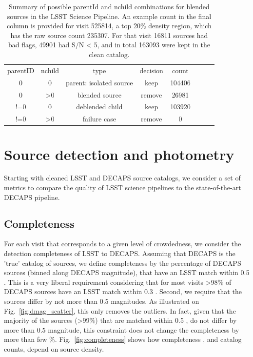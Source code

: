 \documentclass[DM,lsstdraft,toc,usenatbib]{lsstdoc}
\begin{document}
\begin{table}
\centering
\caption{ Summary of possible parentId and nchild combinations for blended sources in the LSST Science Pipeline. An example count in the final column is provided for visit 525814, a top 20\% density region, which has the raw source count 235307. For that visit  16811 sources had bad flags, 49901  had S/N < 5, and in total 163093 were kept in the clean catalog.  }
\label{tab:lsst_deblend}
\begin{tabular}{cccccccc}
parentID & nchild & type  & decision &  count \\
0 & 0 & parent: isolated source & keep & 104406 \\
0 & >0 & blended source & remove & 26981 \\
!=0 & 0 & deblended child & keep  &103920\\
!=0 & >0 & failure case & remove & 0 \\
\hline
\end{tabular}
\end{table}


\section{Source detection and photometry}
\label{sec:metrics}

Starting with cleaned LSST and DECAPS source catalogs, we consider a set of metrics to compare the quality of LSST science pipelines to the  state-of-the-art DECAPS pipeline.  

\subsection{Completeness}

For each visit that corresponds to a given level of crowdedness, we consider the detection completeness of LSST to DECAPS. Assuming that DECAPS is the 'true' catalog of sources, we define completeness by the percentage of DECAPS sources (binned along DECAPS magnitude), that have an LSST match within 0.5 \arcsec. This is a very liberal requirement considering that for most visits >98\% of DECAPS sources have an LSST match within 0.3 \arcsec.  Second,  we require that the sources differ by not more than 0.5 magnitudes. As illustrated on Fig.~\ref{fig:dmag_scatter}, this only removes the outliers.  In fact, given that the majority of the sources (>99\%) that are matched within 0.5 \arcsec, do not differ by more than 0.5 magnitude, this constraint does not change the completeness by more than few \%.   Fig.~\ref{fig:completeness} shows how completeness , and catalog counts, depend on source density.
\end{document}
